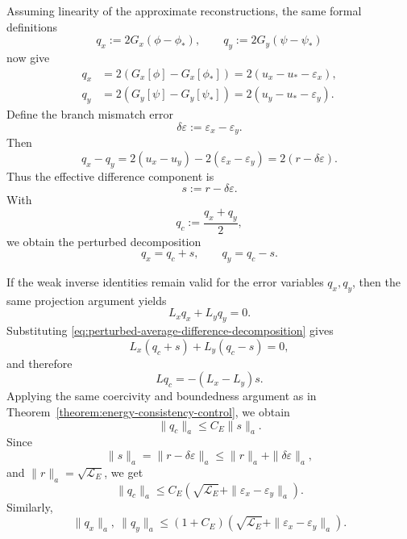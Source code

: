 \documentclass[11pt]{article}
\begin{document}
Assuming linearity of the approximate reconstructions, the same formal
definitions
\[
    q_x:=2G_x(\phi-\phi_*),
    \qquad
    q_y:=2G_y(\psi-\psi_*)
\]
now give
\begin{align}
    q_x
    &=
    2(G_x[\phi]-G_x[\phi_*])
    =
    2(u_x-u_*-\varepsilon_x),
    \label{eq:qx-imperfect-green}
    \\
    q_y
    &=
    2(G_y[\psi]-G_y[\psi_*])
    =
    2(u_y-u_*-\varepsilon_y).
    \label{eq:qy-imperfect-green}
\end{align}
Define the branch mismatch error
\begin{equation}
    \delta\varepsilon
    :=
    \varepsilon_x-\varepsilon_y.
    \label{eq:branch-mismatch-error}
\end{equation}
Then
\[
    q_x-q_y
    =
    2(u_x-u_y)-2(\varepsilon_x-\varepsilon_y)
    =
    2(r-\delta\varepsilon).
\]
Thus the effective difference component is
\begin{equation}
    s:=r-\delta\varepsilon.
    \label{eq:effective-difference-component}
\end{equation}
With
\[
    q_c:=\frac{q_x+q_y}{2},
\]
we obtain the perturbed decomposition
\begin{equation}
    q_x=q_c+s,
    \qquad
    q_y=q_c-s.
    \label{eq:perturbed-average-difference-decomposition}
\end{equation}

If the weak inverse identities remain valid for the error variables
\(q_x,q_y\), then the same projection argument yields
\[
    L_xq_x+L_yq_y=0.
\]
Substituting \eqref{eq:perturbed-average-difference-decomposition} gives
\[
    L_x(q_c+s)+L_y(q_c-s)=0,
\]
and therefore
\begin{equation}
    Lq_c=-(L_x-L_y)s.
    \label{eq:perturbed-structural-identity}
\end{equation}
Applying the same coercivity and boundedness argument as in
Theorem~\ref{theorem:energy-consistency-control}, we obtain
\[
    \|q_c\|_a
    \le
    C_E\|s\|_a.
\]
Since
\[
    \|s\|_a
    =
    \|r-\delta\varepsilon\|_a
    \le
    \|r\|_a+\|\delta\varepsilon\|_a,
\]
and \(\|r\|_a=\sqrt{\mathcal L_E}\), we get
\begin{equation}
    \|q_c\|_a
    \le
    C_E
    \left(
    \sqrt{\mathcal L_E}
    +
    \|\varepsilon_x-\varepsilon_y\|_a
    \right).
    \label{eq:perturbed-qc-estimate}
\end{equation}
Similarly,
\begin{equation}
    \|q_x\|_a,\ \|q_y\|_a
    \le
    (1+C_E)
    \left(
    \sqrt{\mathcal L_E}
    +
    \|\varepsilon_x-\varepsilon_y\|_a
    \right).
    \label{eq:perturbed-qx-qy-estimate}
\end{equation}
\end{document}
